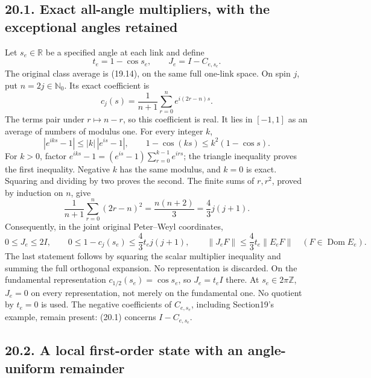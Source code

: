 \documentclass[
]{article}
\begin{document}
\subsection{20.1. Exact all-angle multipliers, with the exceptional
angles
retained}\label{exact-all-angle-multipliers-with-the-exceptional-angles-retained}

Let \(s_e\in\mathbb R\) be a specified angle at each link and define \[
t_e=1-\cos s_e,\qquad J_e=I-C_{e,s_e}.
\] The original class average is (19.14), on the same full one-link
space. On spin \(j\), put \(n=2j\in\mathbb N_0\). Its exact coefficient
is \[
c_j(s)=\frac1{n+1}\sum_{r=0}^n e^{i(2r-n)s}.
\] The terms pair under \(r\mapsto n-r\), so this coefficient is real.
It lies in \([-1,1]\) as an average of numbers of modulus one. For every
integer \(k\), \[
|e^{iks}-1|\le |k|\,|e^{is}-1|,
\qquad 1-\cos(ks)\le k^2(1-\cos s).
\] For \(k>0\), factor \(e^{iks}-1=(e^{is}-1)\sum_{r=0}^{k-1}e^{irs}\);
the triangle inequality proves the first inequality. Negative \(k\) has
the same modulus, and \(k=0\) is exact. Squaring and dividing by two
proves the second. The finite sums of \(r,r^2\), proved by induction on
\(n\), give \[
\frac1{n+1}\sum_{r=0}^n(2r-n)^2
 =\frac{n(n+2)}3=\frac43j(j+1).
\] Consequently, in the joint original Peter--Weyl coordinates, \[
0\le J_e\le2I,\qquad
0\le1-c_j(s_e)\le\frac43t_e j(j+1),\qquad
\|J_eF\|\le\frac43t_e\|E_eF\|
\quad(F\in\operatorname{Dom}E_e).
                                                               \tag{20.1}
\] The last statement follows by squaring the scalar multiplier
inequality and summing the full orthogonal expansion. No representation
is discarded. On the fundamental representation
\(c_{1/2}(s_e)=\cos s_e\), so \(J_e=t_e I\) there. At
\(s_e\in2\pi\mathbb Z\), \(J_e=0\) on every representation, not merely
on the fundamental one. No quotient by \(t_e=0\) is used. The negative
coefficients of \(C_{e,s_e}\), including Section19's example, remain
present: (20.1) concerns \(I-C_{e,s_e}\).

\subsection{20.2. A local first-order state with an angle-uniform
remainder}\label{a-local-first-order-state-with-an-angle-uniform-remainder}
\end{document}
